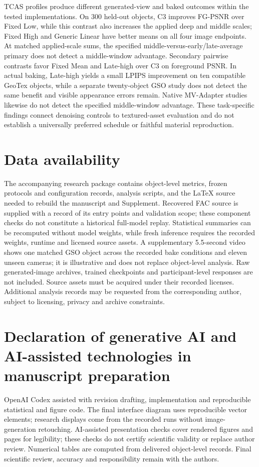 \documentclass[times,twocolumn,final]{elsarticle}
\begin{document}
TCAS profiles produce different generated-view and baked outcomes within the tested implementations. On 300 held-out objects, C3 improves FG-PSNR over Fixed Low, while this contrast also increases the applied deep and middle scales; Fixed High and Generic Linear have better means on all four image endpoints. At matched applied-scale sums, the specified middle-versus-early/late-average primary does not detect a middle-window advantage. Secondary pairwise contrasts favor Fixed Mean and Late-high over C3 on foreground PSNR. In actual baking, Late-high yields a small LPIPS improvement on ten compatible GeoTex objects, while a separate twenty-object GSO study does not detect the same benefit and visible appearance errors remain. Native MV-Adapter studies likewise do not detect the specified middle-window advantage. These task-specific findings connect denoising controls to textured-asset evaluation and do not establish a universally preferred schedule or faithful material reproduction.

\section*{Data availability}

The accompanying research package contains object-level metrics, frozen protocols and configuration records, analysis scripts, and the LaTeX source needed to rebuild the manuscript and Supplement. Recovered FAC source is supplied with a record of its entry points and validation scope; these component checks do not constitute a historical full-model replay. Statistical summaries can be recomputed without model weights, while fresh inference requires the recorded weights, runtime and licensed source assets. A supplementary 5.5-second video shows one matched GSO object across the recorded bake conditions and eleven unseen cameras; it is illustrative and does not replace object-level analysis. Raw generated-image archives, trained checkpoints and participant-level responses are not included. Source assets must be acquired under their recorded licenses. Additional analysis records may be requested from the corresponding author, subject to licensing, privacy and archive constraints.

\section*{Declaration of generative AI and AI-assisted technologies in manuscript preparation}
OpenAI Codex assisted with revision drafting, implementation and reproducible statistical and figure code. The final interface diagram uses reproducible vector elements; research displays come from the recorded runs without image-generation retouching. AI-assisted presentation checks cover rendered figures and pages for legibility; these checks do not certify scientific validity or replace author review. Numerical tables are computed from delivered object-level records. Final scientific review, accuracy and responsibility remain with the authors.
\end{document}
